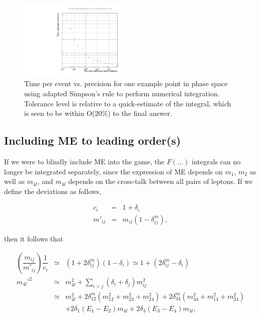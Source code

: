 \documentclass{cmspaper}
\begin{document}
\begin{figure}[htb!]
  \begin{center}
    \includegraphics[width=0.48\textwidth]{figures/PrecisionVsTime_FlatME_AdaptedSimpsons.pdf}
    \caption{Time per event vs. precision for one example point in phase space using adapted Simpson's rule
    to perform numerical integration.  Tolerance level is relative to a quick-estimate of the integral, which
    is seen to be within O(20\%) to the final answer.}
    \label{fig:FlatMEAdaptedSimpsonsPrecisionVsTime}
  \end{center}
\end{figure}

\subsection{Including ME to leading order(s)}

If we were to blindly include ME into the game, the $F(...)$ integrals can no longer be integrated separately,
since the expression of ME depends on $m_1$, $m_2$ as well as $m_{4l}$, and $m_{4l}$ depends on the cross-talk
between all pairs of leptons.  If we define the deviations as follows,

\begin{eqnarray}
c_i &=& 1 + \delta_i\\
m'_{ij} &=& m_{ij} (1 - \delta_{ij}^m),
\end{eqnarray}

then it follows that

\begin{eqnarray}
\left(\dfrac{m_{ij}}{m'_{ij}}\right)\dfrac{1}{c_i} &\simeq& (1 + 2 \delta_{ij}^m) (1 - \delta_i)
   \simeq 1 + (2 \delta_{ij}^m - \delta_i)\\
{m_{4l}'}^2 &\simeq& m_{4l}^2 + \sum_{i>j} (\delta_i + \delta_j) m_{ij}^2\nonumber\\
   &\simeq& m_{4l}^2 + 2 \delta_{12}^m (m_{12}^2 + m_{23}^2 + m_{24}^2)
   + 2 \delta_{34}^m (m_{34}^2 + m_{14}^2 + m_{24}^2)\nonumber\\
   && + 2 \delta_1 (E_1 - E_2) m_{4l} + 2 \delta_3 (E_3 - E_4) m_{4l},
\end{eqnarray}
\end{document}
